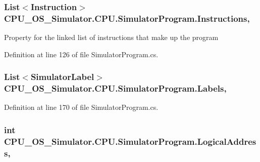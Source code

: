 \subsubsection[{Instructions}]{\setlength{\rightskip}{0pt plus 5cm}List$<${\bf Instruction}$>$ C\+P\+U\+\_\+\+O\+S\+\_\+\+Simulator.\+C\+P\+U.\+Simulator\+Program.\+Instructions\hspace{0.3cm}{\ttfamily [get]}, {\ttfamily [set]}}\label{class_c_p_u___o_s___simulator_1_1_c_p_u_1_1_simulator_program_ae64c462081a1806d5f194c271dbb2686}


Property for the linked list of instructions that make up the program 



Definition at line 126 of file Simulator\+Program.\+cs.

\hypertarget{class_c_p_u___o_s___simulator_1_1_c_p_u_1_1_simulator_program_a3b4c7a32b8f270f9c06614a6ebd52516}{}
\subsubsection[{Labels}]{\setlength{\rightskip}{0pt plus 5cm}List$<${\bf Simulator\+Label}$>$ C\+P\+U\+\_\+\+O\+S\+\_\+\+Simulator.\+C\+P\+U.\+Simulator\+Program.\+Labels\hspace{0.3cm}{\ttfamily [get]}, {\ttfamily [set]}}\label{class_c_p_u___o_s___simulator_1_1_c_p_u_1_1_simulator_program_a3b4c7a32b8f270f9c06614a6ebd52516}


Definition at line 170 of file Simulator\+Program.\+cs.

\hypertarget{class_c_p_u___o_s___simulator_1_1_c_p_u_1_1_simulator_program_afda25ae1ba65b33787dfc1f9af1c1d8a}{}
\subsubsection[{Logical\+Address}]{\setlength{\rightskip}{0pt plus 5cm}int C\+P\+U\+\_\+\+O\+S\+\_\+\+Simulator.\+C\+P\+U.\+Simulator\+Program.\+Logical\+Address\hspace{0.3cm}{\ttfamily [get]}, {\ttfamily [set]}}\label{class_c_p_u___o_s___simulator_1_1_c_p_u_1_1_simulator_program_afda25ae1ba65b33787dfc1f9af1c1d8a}


